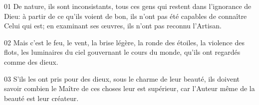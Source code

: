 01 De nature, ils sont inconsistants, tous ces gens qui restent dans l’ignorance de Dieu: à partir de ce qu’ils voient de bon, ils n’ont pas été capables de connaître Celui qui est; en examinant ses œuvres, ils n’ont pas reconnu l’Artisan.

02 Mais c’est le feu, le vent, la brise légère, la ronde des étoiles, la violence des flots, les luminaires du ciel gouvernant le cours du monde, qu’ils ont regardés comme des dieux.

03 S’ils les ont pris pour des dieux, sous le charme de leur beauté, ils doivent savoir combien le Maître de ces choses leur est supérieur, car l’Auteur même de la beauté est leur créateur.
